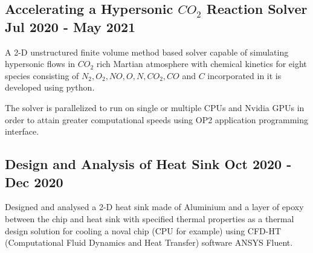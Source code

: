 \subsection{{Accelerating a Hypersonic $CO_2$ Reaction Solver \hfill Jul 2020 - May 2021}}
\begin{zitemize}
\item {A 2-D unstructured ﬁnite volume method based solver capable of simulating hypersonic ﬂows in $CO_2$ rich Martian atmosphere with chemical kinetics for eight species consisting of $N_2 , O_2 , NO, O, N, CO_2 , CO$ and $C$ incorporated in it is developed using python.}
\item {The solver is parallelized to run on single or multiple CPUs and Nvidia GPUs in order to attain greater computational speeds using OP2 application programming interface.}
\end{zitemize}

\subsection{{Design and Analysis of Heat Sink \hfill Oct 2020 - Dec 2020}}
\begin{zitemize}
\item {Designed and analysed a 2-D heat sink made of Aluminium and a layer of epoxy between the chip and heat sink with specified thermal properties as a thermal design solution for cooling a noval chip (CPU for example) using CFD-HT (Computational Fluid Dynamics and Heat Transfer) software ANSYS Fluent.}
\end{zitemize}




